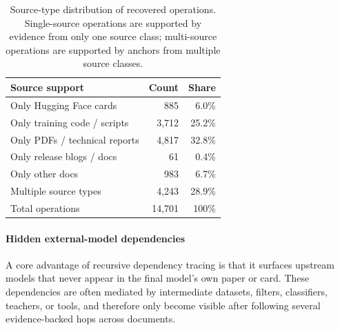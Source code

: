 \begin{table}[t]
\centering
\small
\caption{Source-type distribution of recovered operations. Single-source operations are supported by evidence from only one source class; multi-source operations are supported by anchors from multiple source classes.}
\label{tab:source-type-distribution}
\begin{tabular}{lrr}
\toprule
Source support & Count & Share \\
\midrule
Only Hugging Face cards & 885 & 6.0\% \\
Only training code / scripts & 3,712 & 25.2\% \\
Only PDFs / technical reports & 4,817 & 32.8\% \\
Only release blogs / docs & 61 & 0.4\% \\
Only other docs & 983 & 6.7\% \\
Multiple source types & 4,243 & 28.9\% \\
\midrule
Total operations & 14,701 & 100\% \\
\bottomrule
\end{tabular}
\end{table}

\paragraph{Hidden external-model dependencies}

A core advantage of recursive dependency tracing is that it surfaces upstream models that never appear in the final model's own paper or card. These dependencies are often mediated by intermediate datasets, filters, classifiers, teachers, or tools, and therefore only become visible after following several evidence-backed hops across documents.

